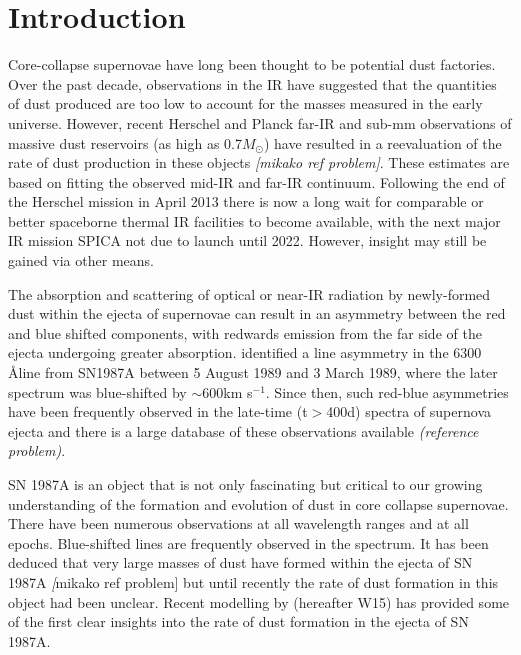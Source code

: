 \documentclass[useAMS,usenatbib,usegraphicx]{mnras}
\begin{document}
\section{Introduction}

Core-collapse supernovae have long been thought to be potential dust factories.  Over the past decade, observations in the IR have suggested that the quantities of dust produced are too low to account for the masses measured in the early universe.  However, recent Herschel and Planck far-IR and sub-mm observations of massive dust reservoirs (as high as 0.7$M_{\odot}$) have resulted in a reevaluation of the rate of dust production in these objects \citep{Barlow2010,Gomez2012b} \textit{[mikako ref problem]}.  These estimates are based on fitting the observed mid-IR and far-IR continuum. Following the end of the Herschel mission in April 2013 there is now a long wait for comparable or better spaceborne thermal IR facilities to become available, with the next major IR mission SPICA %
not due to launch until 2022.  However, insight may still be gained via other means.
   
The absorption and scattering of optical or near-IR radiation by newly-formed dust within the ejecta of supernovae can result in an asymmetry between the red and blue shifted components, with redwards emission from the far side of the ejecta undergoing greater absorption.  \citet{Lucy1989a} identified a line asymmetry in the 6300 \AA \:[OI] line from SN1987A between 5 August 1989 and 3 March 1989, where the later spectrum was blue-shifted by $\sim 600 $km s$^{-1}$. Since then, such red-blue asymmetries have been frequently observed in the late-time (t$>$400d) spectra of supernova ejecta and there is a large database of these observations available \textit{(reference problem)}. %

SN 1987A is an object that is not only fascinating but critical to our growing understanding of the formation and evolution of dust in core collapse supernovae.  There have been numerous observations at all wavelength ranges and at all epochs. Blue-shifted lines are frequently observed in the spectrum.  It has been deduced that very large masses of dust have formed within the ejecta of SN 1987A \textit[mikako ref problem] but until recently the rate of dust formation in this object had been unclear.  Recent modelling by \citet{Wesson2015} (hereafter W15) has provided some of the first clear insights into the rate of dust formation in the ejecta of SN 1987A.  
\end{document}
